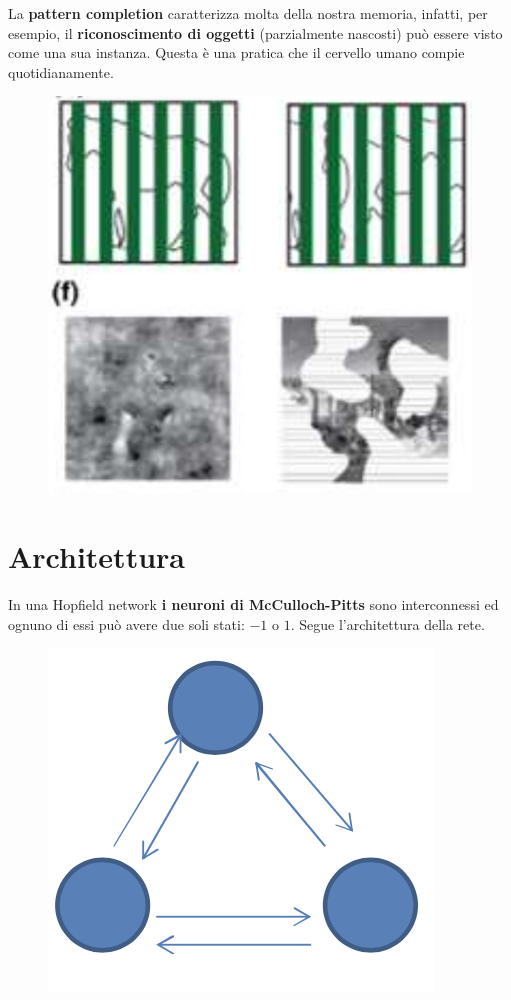 \newpage
La \textbf{pattern completion} caratterizza molta della nostra memoria, infatti, per esempio, il \textbf{riconoscimento di oggetti} (parzialmente nascosti) può essere visto come una sua instanza. Questa è una pratica che il cervello umano compie quotidianamente.
\begin{figure}[!h]
    \includegraphics[scale=.5]{images/hopfield_networks/pattern_rec.png}
    \centering
\end{figure}

\section{Architettura}
In una Hopfield network \textbf{i neuroni di McCulloch-Pitts}  sono interconnessi ed ognuno di essi può avere due soli stati: $-1$ o $1$. Segue l'architettura della rete.
\begin{figure}[!h]
    \includegraphics[scale=.7]{images/hopfield_networks/mp_net.png}
    \centering
\end{figure}



